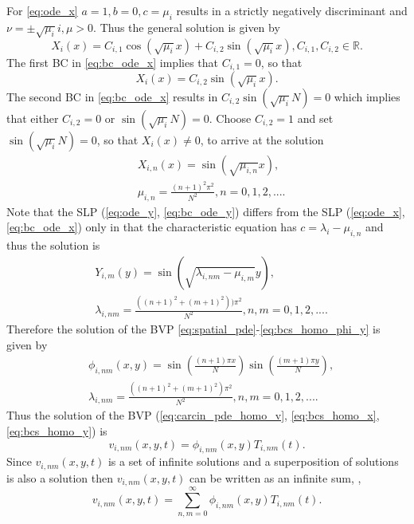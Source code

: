 \documentclass[\main/thesis.tex]{subfiles}
\begin{document}
For \eqref{eq:ode_x} $a {=} 1, b {=} 0, c {=} \mu_i$ results in a strictly negatively discriminant and $\nu {=} {\pm}\sqrt{\mu_i}i, \mu {>} 0$. Thus the general solution is given by
\begin{equation*}
X_i(x) {=} C_{i,1}\cos(\sqrt{\mu_i} x) + C_{i,2}\sin(\sqrt{\mu_i} x), C_{i,1}, C_{i,2} {\in} \mathbb{R}.
\end{equation*}
The first BC in \eqref{eq:bc_ode_x} implies that $C_{i,1} {=} 0$, so that
\begin{equation*}
X_i(x) {=} C_{i,2}\sin(\sqrt{\mu_i} x).
\end{equation*}
The second BC in \eqref{eq:bc_ode_x} results in $C_{i,2}\sin(\sqrt{\mu_i} N) {=} 0$ which implies that either $C_{i,2} {=} 0$ or $\sin(\sqrt{\mu_i} N) {=} 0$. Choose $C_{i, 2} {=} 1$ and set 
$\sin(\sqrt{\mu_i} N) {=} 0$, so that $X_i(x) {\ne} 0$, to arrive at the solution
\begin{align*}
&X_{i,n}(x) {=} \sin(\sqrt{\mu_{i,n}} x), \\
&\mu_{i,n} {=} \frac{(n+1)^2\pi^2}{N^2}, n {=} 0, 1, 2, ....
\end{align*}
Note that the SLP (\ref{eq:ode_y}, \ref{eq:bc_ode_y}) differs from the SLP (\ref{eq:ode_x}, \ref{eq:bc_ode_x}) only in that the characteristic equation has $c {=} \lambda_i {-} \mu_{i, n}$
and thus the solution is
\begin{align*}
&Y_{i,m}(y) {=} \sin(\sqrt{\lambda_{i, nm}{-}\mu_{i, m}} y), \\
&\lambda_{i, nm} {=} \frac{((n+1)^2 {+} (m+1)^2))\pi^2}{N^2}, n,m {=} 0, 1, 2, ....
\end{align*}
Therefore the solution of the BVP \eqref{eq:spatial_pde}-\eqref{eq:bcs_homo_phi_y} is given by
\begin{align}
&\phi_{i,nm}(x, y) {=} \sin\left( \frac{(n+1)\pi x}{N} \right) \sin\left( \frac{(m+1)\pi y}{N} \right),
\label{eq:spatial_sol} \\
&\lambda_{i, nm} {=} \frac{((n+1)^2 {+} (m+1)^2)\pi^2}{N^2}, n,m {=} 0, 1, 2, ....
\label{eq:sep_const}
\end{align}
Thus the solution of the BVP (\ref{eq:carcin_pde_homo_v}, \ref{eq:bcs_homo_x}, \ref{eq:bcs_homo_y}) is
\begin{equation*}
v_{i,nm}(x, y, t) {=} \phi_{i,nm}(x, y)T_{i,nm}(t).
\end{equation*}
Since $v_{i,nm}(x, y, t)$ is a set of infinite solutions and a superposition of solutions is also a solution then $v_{i,nm}(x, y, t)$ can be written as an infinite sum, \ie,
\begin{equation}
v_{i,nm}(x, y, t) {=} \sum_{n,m {=} 0}^{\infty} \phi_{i,nm}(x, y)T_{i,nm}(t).
\label{eq:variable_sol}
\end{equation}
\end{document}
